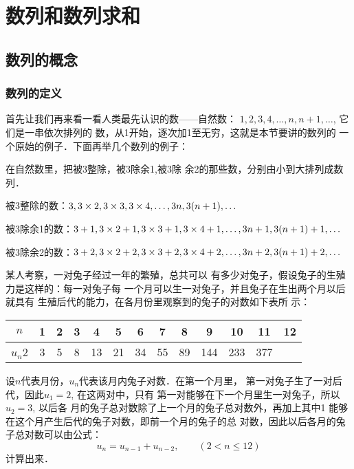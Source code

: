 \chapter{数列和数列求和}

\section{数列的概念}
\subsection{数列的定义}

首先让我们再来看一看人类最先认识的数——自然数：
$1,2,3,4,\ldots,n,n+1,\ldots$, 它们是一串依次排列的
数，从1开始，逐次加1至无穷，这就是本节要讲的数列的
一个原始的例子．下面再举几个数列的例子：

\begin{example}
    在自然数里，把被3整除，被3除余1,被3除
余2的那些数，分别由小到大排列成数列．
\end{example}

\begin{solution}
    被3整除的数：$3,3\times2,3\times3,3\times4,\ldots,3n,3(n+1),\ldots$

被3除余1的数：$3+1,3\times2+1,3\times3+1,3\times4+1,\ldots,3n+1,3(n+1)+1,\ldots$

被3除余2的数：$3+2,3\times2+2,3\times3+2,3\times4+2,\ldots , 3n+2,3(n+1) +2,\ldots$
\end{solution}

\begin{example}
    某人考察，一对兔子经过一年的繁殖，总共可以
有多少对兔子，假设兔子的生殖力是这样的：每一对兔子每
一个月可以生一对兔子，并且兔子在生出两个月以后就具有
生殖后代的能力，在各月份里观察到的兔子的对数如下表所
示：
\begin{center}
\begin{tabular}{c|cccccccccccc}
\hline
$n$&1&2&3&4&5&6&7&8&9&10&11&12\\
\hline
$u_n$2&3&5&8&13&21&34&55&89&144&233&377\\
\hline
\end{tabular}
\end{center}

设$n$代表月份，$u_n$代表该月内兔子对数．在第一个月里，
第一对兔子生了一对后代，因此$u_1=2$, 在这两对中，只有
第一对能够在下一个月里生一对兔子，所以$u_2=3$, 以后各
月的兔子总对数除了上一个月的兔子总对数外，再加上其中1
能够在这个月产生后代的兔子对数，即前一个月的兔子的总
对数，因此以后各月的兔子总对数可以由公式：
\[u_n=u_{n-1}+u_{n-2},\qquad (2<n\le 12)\]
计算出来．
\end{example}

